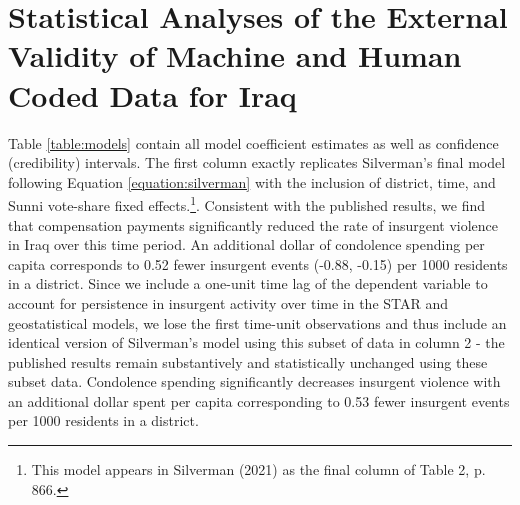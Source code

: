 \documentclass[12pt]{article}
\begin{document}
\section{Statistical Analyses of the External Validity of Machine and Human Coded Data for Iraq}
Table \ref{table:models} contain all model coefficient estimates as well as confidence (credibility) intervals. The first column exactly replicates Silverman's final model following Equation \ref{equation:silverman} with the inclusion of district, time, and Sunni vote-share fixed effects.\footnote{This model appears in Silverman (2021) as the final column of Table 2, p. 866.}. Consistent with the published results, we find that compensation payments significantly reduced the rate of insurgent violence in Iraq over this time period. An additional dollar of condolence spending per capita corresponds to 0.52 fewer insurgent events (-0.88, -0.15) per 1000 residents in a district. Since we include a one-unit time lag of the dependent variable to account for persistence in insurgent activity over time in the STAR and geostatistical models, we lose the first time-unit observations and thus include an identical version of Silverman's model using this subset of data in column 2 - the published results remain substantively and statistically unchanged using these subset data. Condolence spending significantly decreases insurgent violence with an additional dollar spent per capita corresponding to 0.53 fewer insurgent events per 1000 residents in a district.
\end{document}
